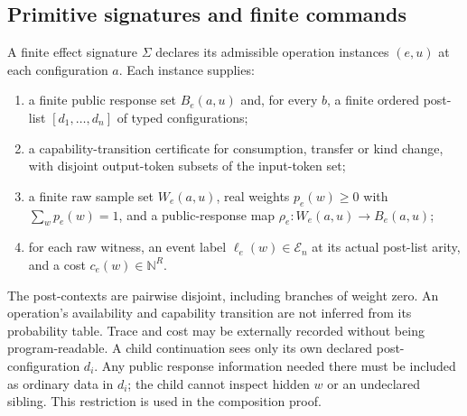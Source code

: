 \documentclass[11pt,a4paper]{article}
\theoremstyle{definition}
\begin{document}
\subsection{Primitive signatures and finite commands}
A finite effect signature $\Sigma$ declares its admissible operation
instances $(e,u)$ at each configuration $a$. Each instance supplies:
\begin{enumerate}[label=\textup{(\alph*)}]
\item a finite public response set $B_e(a,u)$ and, for every $b$, a finite
ordered post-list $[d_1,\ldots,d_n]$ of typed configurations;
\item a capability-transition certificate for consumption, transfer or kind
change, with disjoint output-token subsets of the input-token set;
\item a finite raw sample set $W_e(a,u)$, real weights $p_e(w)\ge0$ with
$\sum_wp_e(w)=1$, and a public-response map $\rho_e:W_e(a,u)\to B_e(a,u)$;
\item for each raw witness, an event label $\ell_e(w)\in\mathcal E_n$
at its actual post-list arity, and a cost $c_e(w)\in\mathbb N^R$.
\end{enumerate}
The post-contexts are pairwise disjoint, including branches of weight zero.
An operation's availability and capability transition are not inferred from
its probability table. Trace and cost may be externally recorded without
being program-readable. A child continuation sees only its own declared
post-configuration $d_i$. Any public response information needed there must
be included as ordinary data in $d_i$; the child cannot inspect hidden $w$
or an undeclared sibling. This restriction is used in the composition proof.
\end{document}
